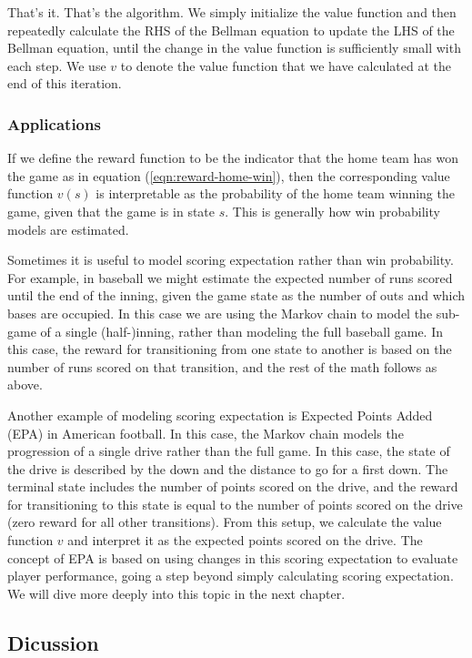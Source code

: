 \documentclass{article}
\begin{document}
      That's it. That's the algorithm. We simply initialize the value function and then repeatedly calculate the RHS of the Bellman equation to update the LHS of the Bellman equation, until the change in the value function is sufficiently small with each step. We use $v$ to denote the value function that we have calculated at the end of this iteration.

    \subsubsection{\sc Applications}

      If we define the reward function to be the indicator that the home team has won the game as in equation (\ref{eqn:reward-home-win}), then the corresponding value function $v(s)$ is interpretable as the probability of the home team winning the game, given that the game is in state $s$. This is generally how win probability models are estimated.

      Sometimes it is useful to model scoring expectation rather than win probability. For example, in baseball we might estimate the expected number of runs scored until the end of the inning, given the game state as the number of outs and which bases are occupied. In this case we are using the Markov chain to model the sub-game of a single (half-)inning, rather than modeling the full baseball game. In this case, the reward for transitioning from one state to another is based on the number of runs scored on that transition, and the rest of the math follows as above.

      Another example of modeling scoring expectation is Expected Points Added (EPA) in American football. In this case, the Markov chain models the progression of a single drive rather than the full game. In this case, the state of the drive is described by the down and the distance to go for a first down. The terminal state includes the number of points scored on the drive, and the reward for transitioning to this state is equal to the number of points scored on the drive (zero reward for all other transitions). From this setup, we calculate the value function $v$ and interpret it as the expected points scored on the drive. The concept of EPA is based on using changes in this scoring expectation to evaluate player performance, going a step beyond simply calculating scoring expectation. We will dive more deeply into this topic in the next chapter.

  \newpage

    \subsection{\sc Dicussion}
\end{document}
